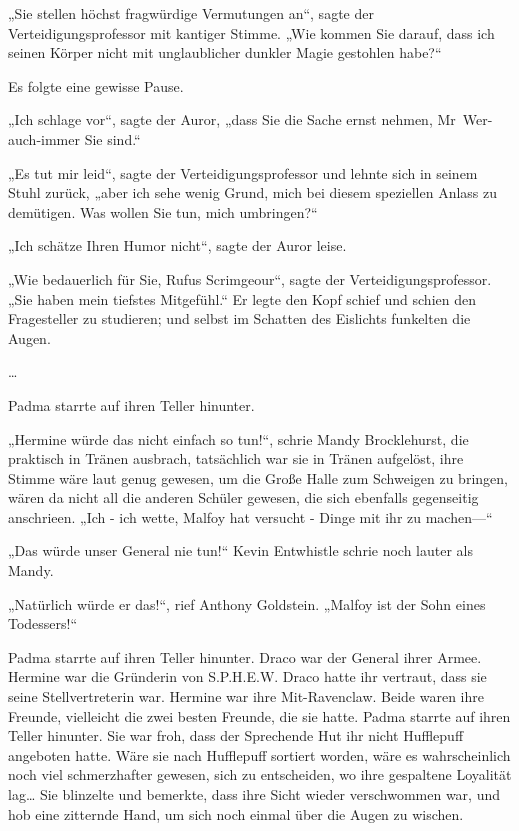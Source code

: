 {„Sie stellen höchst fragwürdige Vermutungen an“, sagte der Verteidigungsprofessor mit kantiger Stimme. „Wie kommen Sie darauf, dass ich seinen Körper nicht mit unglaublicher dunkler Magie gestohlen habe?“

Es folgte eine gewisse Pause.

„Ich schlage vor“, sagte der Auror, „dass Sie die Sache ernst nehmen, Mr~Wer-auch-immer Sie sind.“

„Es tut mir leid“, sagte der Verteidigungsprofessor und lehnte sich in seinem Stuhl zurück, „aber ich sehe wenig Grund, mich bei diesem speziellen Anlass zu demütigen. Was wollen Sie tun, mich umbringen?“

„Ich schätze Ihren Humor nicht“, sagte der Auror leise.

„Wie bedauerlich für Sie, Rufus Scrimgeour“, sagte der Verteidigungsprofessor. „Sie haben mein tiefstes Mitgefühl.“ Er legte den Kopf schief und schien den Fragesteller zu studieren; und selbst im Schatten des Eislichts funkelten die Augen.

…

Padma starrte auf ihren Teller hinunter.

„Hermine würde das nicht einfach so tun!“, schrie Mandy Brocklehurst, die praktisch in Tränen ausbrach, tatsächlich war sie in Tränen aufgelöst, ihre Stimme wäre laut genug gewesen, um die Große Halle zum Schweigen zu bringen, wären da nicht all die anderen Schüler gewesen, die sich ebenfalls gegenseitig anschrieen. „Ich - ich wette, Malfoy hat versucht - Dinge mit ihr zu machen—“

„Das würde unser General nie tun!“ Kevin Entwhistle schrie noch lauter als Mandy.

„Natürlich würde er das!“, rief Anthony Goldstein. „Malfoy ist der Sohn eines Todessers!“

Padma starrte auf ihren Teller hinunter. Draco war der General ihrer Armee. Hermine war die Gründerin von S.P.H.E.W. Draco hatte ihr vertraut, dass sie seine Stellvertreterin war. Hermine war ihre Mit-Ravenclaw. Beide waren ihre Freunde, vielleicht die zwei besten Freunde, die sie hatte. Padma starrte auf ihren Teller hinunter. Sie war froh, dass der Sprechende Hut ihr nicht Hufflepuff angeboten hatte. Wäre sie nach Hufflepuff sortiert worden, wäre es wahrscheinlich noch viel schmerzhafter gewesen, sich zu entscheiden, wo ihre gespaltene Loyalität lag… Sie blinzelte und bemerkte, dass ihre Sicht wieder verschwommen war, und hob eine zitternde Hand, um sich noch einmal über die Augen zu wischen.

}
